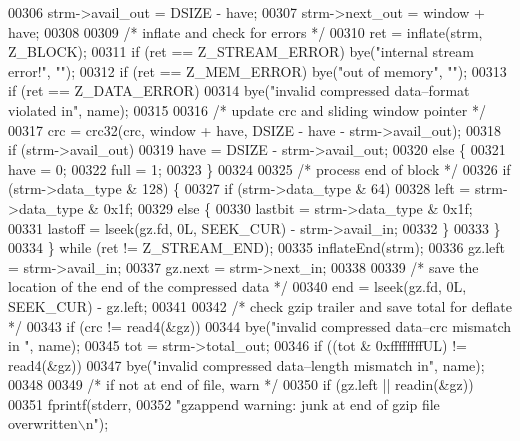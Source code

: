 \begin{DoxyCode}
{00306         strm->avail\_out = DSIZE - have;
00307         strm->next\_out = window + have;
00308 
00309         \textcolor{comment}{/* inflate and check for errors */}
00310         ret = inflate(strm, Z\_BLOCK);
00311         \textcolor{keywordflow}{if} (ret == Z\_STREAM\_ERROR) bye(\textcolor{stringliteral}{"internal stream error!"}, \textcolor{stringliteral}{""});
00312         \textcolor{keywordflow}{if} (ret == Z\_MEM\_ERROR) bye(\textcolor{stringliteral}{"out of memory"}, \textcolor{stringliteral}{""});
00313         \textcolor{keywordflow}{if} (ret == Z\_DATA\_ERROR)
00314             bye(\textcolor{stringliteral}{"invalid compressed data--format violated in"}, name);
00315 
00316         \textcolor{comment}{/* update crc and sliding window pointer */}
00317         crc = crc32(crc, window + have, DSIZE - have - strm->avail\_out);
00318         \textcolor{keywordflow}{if} (strm->avail\_out)
00319             have = DSIZE - strm->avail\_out;
00320         \textcolor{keywordflow}{else} \{
00321             have = 0;
00322             full = 1;
00323         \}
00324 
00325         \textcolor{comment}{/* process end of block */}
00326         \textcolor{keywordflow}{if} (strm->data\_type & 128) \{
00327             \textcolor{keywordflow}{if} (strm->data\_type & 64)
00328                 left = strm->data\_type & 0x1f;
00329             \textcolor{keywordflow}{else} \{
00330                 lastbit = strm->data\_type & 0x1f;
00331                 lastoff = lseek(gz.fd, 0L, SEEK\_CUR) - strm->avail\_in;
00332             \}
00333         \}
00334     \} \textcolor{keywordflow}{while} (ret != Z\_STREAM\_END);
00335     inflateEnd(strm);
00336     gz.left = strm->avail\_in;
00337     gz.next = strm->next\_in;
00338 
00339     \textcolor{comment}{/* save the location of the end of the compressed data */}
00340     end = lseek(gz.fd, 0L, SEEK\_CUR) - gz.left;
00341 
00342     \textcolor{comment}{/* check gzip trailer and save total for deflate */}
00343     \textcolor{keywordflow}{if} (crc != read4(&gz))
00344         bye(\textcolor{stringliteral}{"invalid compressed data--crc mismatch in "}, name);
00345     tot = strm->total\_out;
00346     \textcolor{keywordflow}{if} ((tot & 0xffffffffUL) != read4(&gz))
00347         bye(\textcolor{stringliteral}{"invalid compressed data--length mismatch in"}, name);
00348 
00349     \textcolor{comment}{/* if not at end of file, warn */}
00350     \textcolor{keywordflow}{if} (gz.left || readin(&gz))
00351         fprintf(stderr,
00352             \textcolor{stringliteral}{"gzappend warning: junk at end of gzip file overwritten\(\backslash\)n"});
}
\end{DoxyCode}
